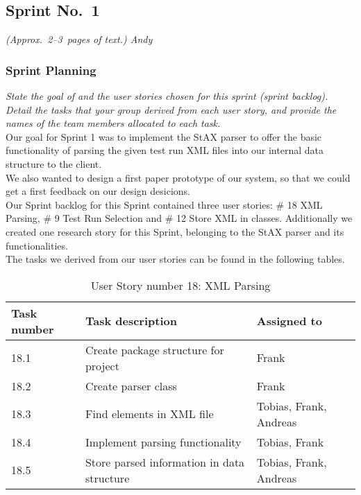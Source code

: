 
\subsection{Sprint No.~1}

\emph{(Approx.~2--3~pages of text.) Andy}

\subsubsection*{Sprint Planning}

\emph{State the goal of and the user stories chosen for this sprint (sprint backlog). Detail the tasks that your group derived from each user story, and provide the names of the team members allocated to each task.} \\

Our goal for Sprint 1 was to implement the StAX parser to offer the basic functionality of parsing the given test run XML files into our internal data structure to the client. \\ 
We also wanted to design a first paper prototype of our system, so that we could get a first feedback on our design desicions. \\ 
Our Sprint backlog for this Sprint contained three user stories: \# 18 XML Parsing, \# 9 Test Run Selection and \# 12 Store XML in classes. Additionally we created one research story for this Sprint, belonging to the StAX parser and its functionalities. \\ 
The tasks we derived from our user stories can be found in the following tables. \\ 

\begin{table}[h]
  \caption{User Story number 18: XML Parsing}
  \label{US_Parsing}
  \centering
  \begin{tabular}{p{1.5cm}|p{9cm}|p{3cm}|}
  	Task number & Task description & Assigned to \\ 
  	\hline
  	\hline
  	18.1 & Create package structure for project & Frank \\
  	\hline
  	18.2 & Create parser class & Frank \\ 
  	\hline
  	18.3 & Find elements in XML file & Tobias, Frank, Andreas \\ 
  	\hline
  	18.4 & Implement parsing functionality & Tobias, Frank \\ 
  	\hline
  	18.5 & Store parsed information in data structure & Tobias, Frank, Andreas \\ 
  	\hline
  \end{tabular}
\end{table} 

